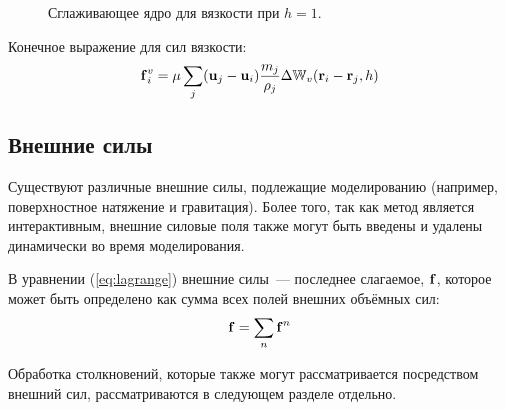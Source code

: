 \begin{figure}
  \centering
  \resizebox{.5\textwidth}{!} {
  }%
  \resizebox{.5\textwidth}{!} {
  }
  \caption{Сглаживающее ядро для вязкости при $h=1$.}
  \label{fig:kernel-viscosity}
\end{figure}

Конечное выражение для сил вязкости:
\begin{equation} \label{eq:viscosity-force}
  \boldsymbol{\mathbf{f}}_i^v=\mu\sum_{j}(\boldsymbol{\mathbf{u}}_j-\boldsymbol{\mathbf{u}}_i)\frac{m_j}{\rho_j}\Delta\mathbb W_v(\boldsymbol{\mathbf{r}}_i-\boldsymbol{\mathbf{r}}_j, h)
\end{equation}


\subsection{Внешние силы}
Существуют различные внешние силы, подлежащие моделированию (например, поверхностное натяжение и гравитация). Более того, так как метод является интерактивным, внешние силовые поля также могут быть введены и удалены динамически во время моделирования.

В уравнении (\ref{eq:lagrange}) внешние силы~--- последнее слагаемое, $\boldsymbol{\mathbf{f}}$, которое может быть определено как сумма всех полей внешних объёмных сил:
\begin{equation}
  \boldsymbol{\mathbf{f}}=\sum_n \boldsymbol{\mathbf{f}}^n
\end{equation}

Обработка столкновений, которые также могут рассматривается посредством внешний сил, рассматриваются в следующем разделе отдельно.


